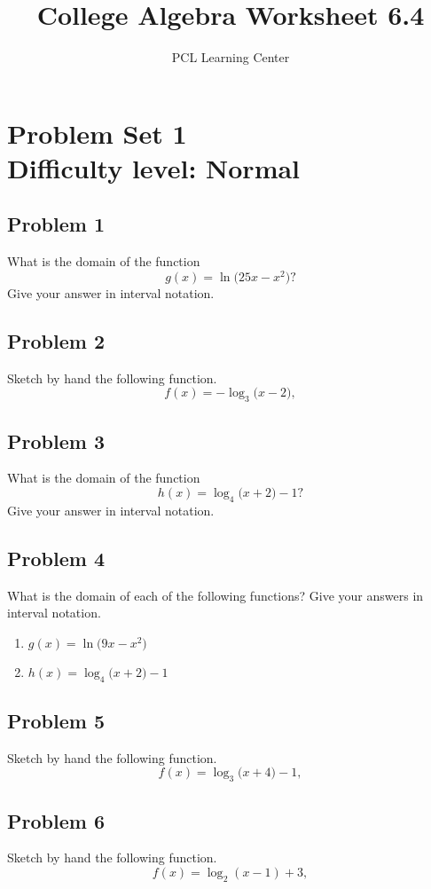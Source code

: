 \documentclass[12pt]{article}
\title{College Algebra Worksheet 6.4}
\author{PCL Learning Center}
\date{}
\begin{document}
\maketitle

\section*{Problem Set 1\\Difficulty level: Normal}
\subsection*{Problem 1}
What is the domain of the function
\[
g(x) = \ln\bigl(25x - x^2\bigr)?
\]
Give your answer in interval notation.

\subsection*{Problem 2}
Sketch by hand the following function.
\[
f(x) = -\log_{3}\bigl(x - 2\bigr),
\]


\subsection*{Problem 3}
What is the domain of the function
\[
h(x) = \log_{4}\bigl(x + 2\bigr) - 1?
\]
Give your answer in interval notation.

\subsection*{Problem 4}
What is the domain of each of the following functions? Give your answers in interval notation.
\begin{enumerate}[label=(\alph*)]
  \item \(g(x) = \ln\bigl(9x - x^2\bigr)\)
  \item \(h(x) = \log_{4}\bigl(x + 2\bigr) - 1\)
\end{enumerate}

\subsection*{Problem 5}
Sketch by hand the following function.
\[
f(x) = \log_{3}\bigl(x + 4\bigr) - 1,
\]

\subsection*{Problem 6}
Sketch by hand the following function.
\[
f(x) = \log_{2}(x - 1) + 3,
\]
\end{document}
